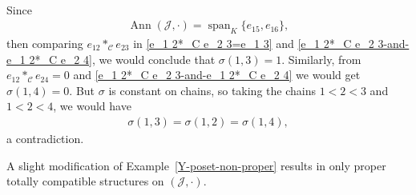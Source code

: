 \documentclass{jonasart}
\newcommand{\C}{\mathcal{C}}
\newcommand{\J}{\mathcal{J}}
\newcommand{\sg}{\sigma}
\DeclareMathOperator{\Ann}{Ann}
\DeclareMathOperator{\spn}{span}
\begin{document}
\begin{example}
\begin{align}
		\end{align}
		Since
		\begin{align*}
			\Ann(\J,\cdot)=\spn_K\{e_{15},e_{16}\},
		\end{align*}
		then comparing $e_{12}*_\C e_{23}$ in \eqref{e_1 2*_C e_2 3=e_1 3} and \eqref{e_1 2*_C e_2 3-and-e_1 2*_C e_2 4}, we would conclude that $\sg(1,3)=1$. Similarly, from $e_{12}*_\C e_{24}=0$ and \eqref{e_1 2*_C e_2 3-and-e_1 2*_C e_2 4} we would get $\sg(1,4)=0$. But $\sg$ is constant on chains, so taking the chains $1<2<3$ and $1<2<4$, we would have
		\begin{align*}
			\sg(1,3)=\sg(1,2)=\sg(1,4),
		\end{align*}
		a contradiction.
	\end{example}

	A slight modification of Example~\ref{Y-poset-non-proper} results in only proper totally compatible structures on $(\J,\cdot)$.
\end{document}
